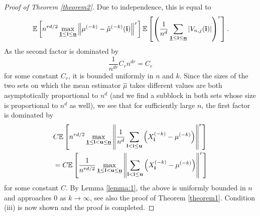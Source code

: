 \begin{proof}[Proof of Theorem \ref{theorem2}]
    Due to independence, this is equal to
    \begin{align*}
        \EE{ n^{rd/2} \max\limits_{\usbf[1] \leq \mathbf{i} \leq \usbf[n]} \left\| \mu^{(-k)} - \hat{\mu}^{(-k)}(\mathbf{i}) \right\|^r} \EE{ \left(\frac{1}{n^{d}} \sum\limits_{\usbf[1] \leq \mathbf{i} \leq \usbf[n]} |V_{n, j}(\mathbf{i})| \right)^r}.
    \end{align*}
    As the second factor is dominated by
    \[ \frac{1}{n^{dr}} C_r n^{dr} = C_r \]
    for some constant $C_r$, it is bounded uniformly in $n$ and $k$. 
    Since the sizes of the two sets on which the mean estimator $\hat{\mu}$ takes different values are both asymptotically proportional to $n^d$ (and we find a subblock in both sets whose size is proportional to $n^d$ as well), 
    we see that for sufficiently large $n$, the first factor is dominated by
    \begin{align*}
        & C \EE{n^{rd/2} \max\limits_{\usbf[1] \leq \mathbf{l} < \mathbf{u} \leq \usbf[n]} \left\| \frac{1}{n^d} \sum\limits_{\mathbf{l} < \mathbf{i} \leq \mathbf{u}} \left(X_{\mathbf{i}}^{(-k)}-\mu^{(-k)}\right) \right\|^r} \\
        & = C \EE{ \frac{1}{n^{rd/2}}\max\limits_{\usbf[1] \leq \mathbf{l} < \mathbf{u} \leq \usbf[n]} \left\| \sum\limits_{\mathbf{l} < \mathbf{i} \leq \mathbf{u}} \left(X_{\mathbf{i}}^{(-k)}-\mu^{(-k)}\right) \right\|^r}
    \end{align*}
    for some constant $C$.
    By Lemma \ref{lemma:1}, the above is uniformly bounded in $n$ and approaches $0$ as $k \to \infty$, see also the proof of Theorem \ref{theorem1}.
    Condition (iii) is now shown and the proof is completed.
\end{proof}
